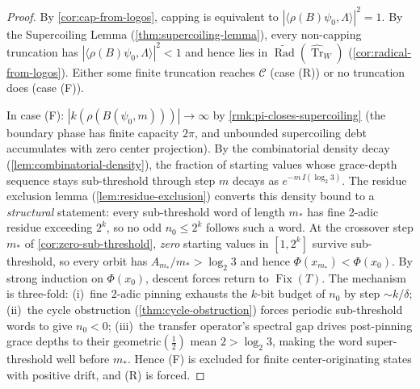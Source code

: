 \documentclass[11pt,a4paper]{article}
\theoremstyle{plain}
\theoremstyle{definition}
\theoremstyle{remark}
\numberwithin{equation}{section}
\DeclareMathOperator{\Tr}{Tr}
\DeclareMathOperator{\Fix}{Fix}
\DeclareMathOperator{\Rad}{Rad}
\begin{document}
\begin{proof}
By \cref{cor:cap-from-logos}, capping is equivalent to
$|\langle\rho(B)\psi_0,\Lambda\rangle|^2=1$.  By the Supercoiling
Lemma (\cref{thm:supercoiling-lemma}), every non-capping
truncation has $|\langle\rho(B)\psi_0,\Lambda\rangle|^2<1$ and
hence lies in $\widetilde{\Rad}(\widehat{\Tr}_W)$
(\cref{cor:radical-from-logos}).  Either some finite truncation
reaches $\mathcal{C}$ (case (R)) or no truncation does (case (F)).

In case (F): $|k(\rho(B(\psi_0,m)))|\to\infty$ by
\cref{rmk:pi-closes-supercoiling} (the boundary phase has finite
capacity $2\pi$, and unbounded supercoiling debt accumulates with
zero center projection).  By the combinatorial density decay
(\cref{lem:combinatorial-density}), the fraction of starting
values whose grace-depth sequence stays sub-threshold through
step $m$ decays as $e^{-m\,I(\log_2 3)}$.  The residue exclusion
lemma (\cref{lem:residue-exclusion}) converts this density bound
to a \emph{structural} statement: every sub-threshold word of
length $m_*$ has fine 2-adic residue exceeding $2^k$, so no odd
$n_0\le 2^k$ follows such a word.
At the crossover step $m_*$ of \cref{cor:zero-sub-threshold},
\emph{zero} starting values in $[1,2^k]$ survive sub-threshold,
so every orbit has $A_{m_*}/m_*>\log_2 3$ and hence
$\Phi(x_{m_*})<\Phi(x_0)$.
By strong induction on $\Phi(x_0)$, descent forces return to
$\Fix(T)$.  The mechanism is three-fold: (i)~fine 2-adic pinning
exhausts the $k$-bit budget of $n_0$ by step $\sim k/\delta$;
(ii)~the cycle obstruction (\cref{thm:cycle-obstruction})
forces periodic sub-threshold words to give $n_0<0$; (iii)~the
transfer operator's spectral gap drives post-pinning grace depths
to their geometric$(\tfrac{1}{2})$ mean $2>\log_2 3$, making the
word super-threshold well before $m_*$.
Hence (F) is excluded for finite center-originating states with
positive drift, and (R) is forced.
\end{proof}
\end{document}
